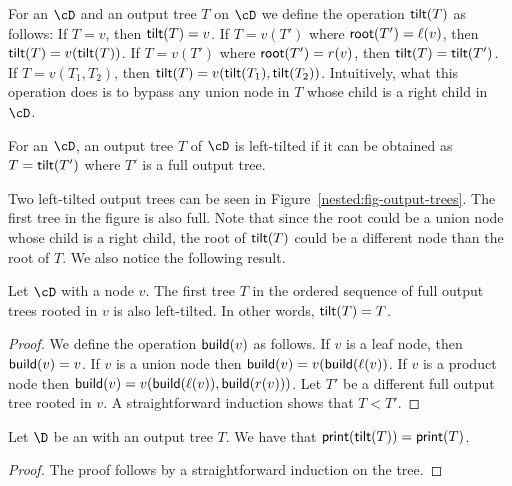 For an \dsabbr $\cD$ and an output tree $T$ on $\cD$ we define the operation ${\sf tilt}(T)$ as follows: If $T = v$, then ${\sf tilt}(T) = v$. If $T = v(T')$ where ${\sf root}(T') = \ell(v)$, then ${\sf tilt}(T) = v({\sf tilt}(T))$. If $T = v(T')$ where ${\sf root}(T') = r(v)$, then ${\sf tilt}(T) = {\sf tilt}(T')$. If $T = v(T_1,T_2)$, then ${\sf tilt}(T) = v({\sf tilt}(T_1),{\sf tilt}(T_2))$. Intuitively, what this operation does is to bypass any union node in $T$ whose child is a right child in $\cD$.

\begin{definition}
	For an \dsabbr $\cD$, an output tree $T$ of $\cD$ is left-tilted if it can be obtained as $T = {\sf tilt}(T')$ where $T'$ is a full output tree.
\end{definition}

Two left-tilted output trees can be seen in Figure~\ref{nested:fig-output-trees}. The first tree in the figure is also full. Note that since the root could be a union node whose child is a right child, the root of ${\sf tilt}(T)$ could be a different node than the root of $T$. We also notice the following result.

\begin{lemma}\label{nested:appendix:enum-first}
	Let $\cD$ \dsabbr with a node $v$. The first tree $T$ in the ordered sequence of full output trees rooted in $v$ is also left-tilted. In other words, ${\sf tilt}(T) = T$.
\end{lemma}
\begin{proof}
	We define the operation ${\sf build}(v)$ as follows. If $v$ is a leaf node, then ${\sf build}(v) = v$. If $v$ is a union node then ${\sf build}(v) = v({\sf build}(\ell(v))$. If $v$ is a product node then ${\sf build}(v) = v({\sf build}(\ell(v)),{\sf build}(r(v)))$. Let $T'$ be a different full output tree rooted in $v$. A straightforward induction shows that $T < T'$.
\end{proof}

\begin{lemma}
	Let $\D$ be an \dsabbr with an output tree $T$. We have that ${\sf print}({\sf tilt}(T)) = {\sf print}(T)$.
\end{lemma}
\begin{proof}
	The proof follows by a straightforward induction on the tree. 
\end{proof}



